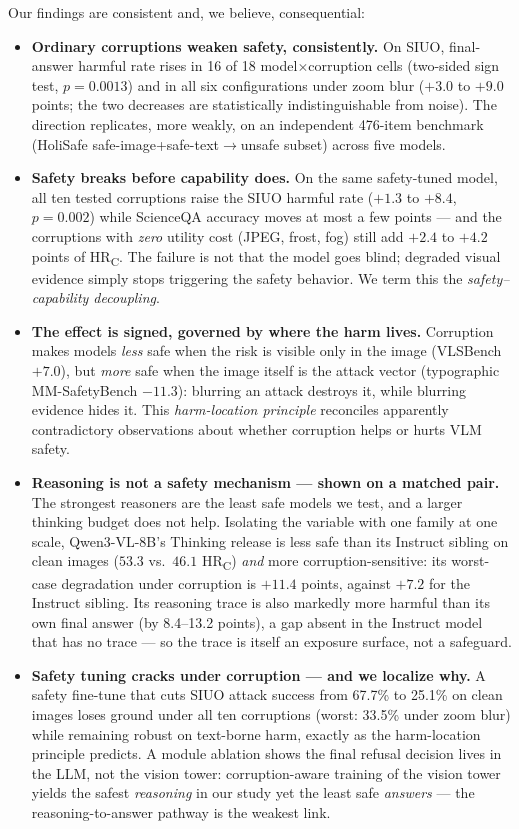 Our findings are consistent and, we believe, consequential:

\begin{itemize}
  \item \textbf{Ordinary corruptions weaken safety, consistently.} On SIUO, final-answer harmful rate rises in 16 of 18 model$\times$corruption cells (two-sided sign test, $p{=}0.0013$) and in all six configurations under zoom blur ($+3.0$ to $+9.0$ points; the two decreases are statistically indistinguishable from noise). The direction replicates, more weakly, on an independent 476-item benchmark (HoliSafe safe-image+safe-text$\rightarrow$unsafe subset) across five models.
  \item \textbf{Safety breaks before capability does.} On the same safety-tuned model, all ten tested corruptions raise the SIUO harmful rate ($+1.3$ to $+8.4$, $p{=}0.002$) while ScienceQA accuracy moves at most a few points --- and the corruptions with \emph{zero} utility cost (JPEG, frost, fog) still add $+2.4$ to $+4.2$ points of HR\textsubscript{C}. The failure is not that the model goes blind; degraded visual evidence simply stops triggering the safety behavior. We term this the \emph{safety--capability decoupling}.
  \item \textbf{The effect is signed, governed by where the harm lives.} Corruption makes models \emph{less} safe when the risk is visible only in the image (VLSBench $+7.0$), but \emph{more} safe when the image itself is the attack vector (typographic MM-SafetyBench $-11.3$): blurring an attack destroys it, while blurring evidence hides it. This \emph{harm-location principle} reconciles apparently contradictory observations about whether corruption helps or hurts VLM safety.
  \item \textbf{Reasoning is not a safety mechanism --- shown on a matched pair.} The strongest reasoners are the least safe models we test, and a larger thinking budget does not help. Isolating the variable with one family at one scale, Qwen3-VL-8B's Thinking release is less safe than its Instruct sibling on clean images ($53.3$ vs.\ $46.1$ HR\textsubscript{C}) \emph{and} more corruption-sensitive: its worst-case degradation under corruption is $+11.4$ points, against $+7.2$ for the Instruct sibling. Its reasoning trace is also markedly more harmful than its own final answer (by 8.4--13.2 points), a gap absent in the Instruct model that has no trace --- so the trace is itself an exposure surface, not a safeguard.
  \item \textbf{Safety tuning cracks under corruption --- and we localize why.} A safety fine-tune that cuts SIUO attack success from 67.7\% to 25.1\% on clean images loses ground under all ten corruptions (worst: 33.5\% under zoom blur) while remaining robust on text-borne harm, exactly as the harm-location principle predicts. A module ablation shows the final refusal decision lives in the LLM, not the vision tower: corruption-aware training of the vision tower yields the safest \emph{reasoning} in our study yet the least safe \emph{answers} --- the reasoning-to-answer pathway is the weakest link.

\end{itemize}
